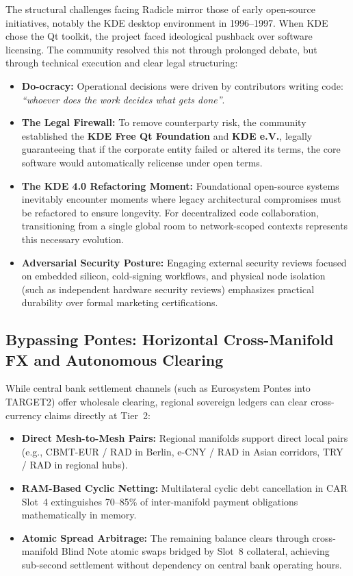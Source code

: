 \documentclass[a4paper,11pt,twoside,parskip=half-,headings=small]{scrartcl}
\begin{document}
The structural challenges facing Radicle mirror those of early open-source initiatives, notably the KDE desktop environment in 1996--1997. When KDE chose the Qt toolkit, the project faced ideological pushback over software licensing. The community resolved this not through prolonged debate, but through technical execution and clear legal structuring:
\begin{itemize}
  \item \textbf{Do-ocracy:} Operational decisions were driven by contributors writing code: \emph{``whoever does the work decides what gets done''}.
  \item \textbf{The Legal Firewall:} To remove counterparty risk, the community established the \textbf{KDE Free Qt Foundation} and \textbf{KDE e.V.}, legally guaranteeing that if the corporate entity failed or altered its terms, the core software would automatically relicense under open terms.
  \item \textbf{The KDE 4.0 Refactoring Moment:} Foundational open-source systems inevitably encounter moments where legacy architectural compromises must be refactored to ensure longevity. For decentralized code collaboration, transitioning from a single global room to network-scoped contexts represents this necessary evolution.
  \item \textbf{Adversarial Security Posture:} Engaging external security reviews focused on embedded silicon, cold-signing workflows, and physical node isolation (such as independent hardware security reviews) emphasizes practical durability over formal marketing certifications.
\end{itemize}

\subsection{Bypassing Pontes: Horizontal Cross-Manifold FX and Autonomous Clearing}
\label{sec:pontes_bypass}

While central bank settlement channels (such as Eurosystem Pontes into TARGET2) offer wholesale clearing, regional sovereign ledgers can clear cross-currency claims directly at Tier~2:
\begin{itemize}
  \item \textbf{Direct Mesh-to-Mesh Pairs:} Regional manifolds support direct local pairs (e.g., CBMT-EUR / RAD in Berlin, e-CNY / RAD in Asian corridors, TRY / RAD in regional hubs).
  \item \textbf{RAM-Based Cyclic Netting:} Multilateral cyclic debt cancellation in CAR Slot~4 extinguishes 70--85\% of inter-manifold payment obligations mathematically in memory.
  \item \textbf{Atomic Spread Arbitrage:} The remaining balance clears through cross-manifold Blind Note atomic swaps bridged by Slot~8 collateral, achieving sub-second settlement without dependency on central bank operating hours.
\end{itemize}
\end{document}
